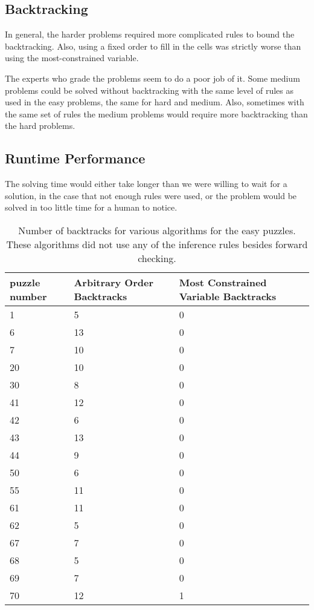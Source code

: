 \documentclass{article}
\begin{document}
\subsection{Backtracking}
In general, the harder problems required more complicated rules to bound the backtracking. Also, using a fixed order to fill in the cells was strictly worse than using the most-constrained variable.

The experts who grade the problems seem to do a poor job of it. Some medium problems could be solved without backtracking with the same level of rules as used in the easy problems, the same for hard and medium. Also, sometimes with the same set of rules the medium problems would require more backtracking than the hard problems.
 \subsection{Runtime Performance}
 The solving time would either take longer than we were willing to wait for a solution, in the case that not enough rules were used, or the problem would be solved in too little time for a human to notice. 
\begin{table}[h]\centering
  \begin{tabular}{lll}
    \toprule
    puzzle number& Arbitrary Order Backtracks & Most Constrained Variable Backtracks\\
    \midrule
    1& 5 & 0\\
    \midrule
    6& 13&0\\
    \midrule
    7& 10&0\\
    \midrule
    20&10&0\\
    \midrule
    30& 8&0\\
    \midrule
    41& 12& 0\\
    \midrule
    42& 6& 0\\
    \midrule
    43& 13&0\\
    \midrule
    44&9&0\\
    \midrule
    50&6&0\\
    \midrule
    55 &11 &0\\
    \midrule
    61& 11 &0\\
    \midrule
    62 &5&0\\
    \midrule
    67&7&0\\
    \midrule
    68& 5&0\\
    \midrule
    69&7&0\\
    \midrule
    70& 12 &1\\
    \bottomrule
  \end{tabular}
  \caption{Number of backtracks for various algorithms for the easy puzzles. These algorithms did not use any of the inference rules besides forward checking. }
  \label{tab:resultsEasy}
\end{table}
\end{document}
